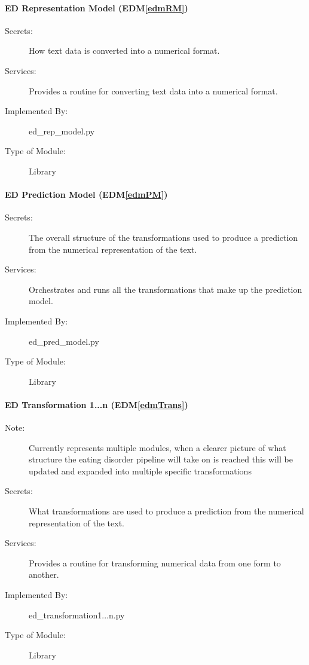 \documentclass[12pt, titlepage]{article}
\newcommand{\edmref}[1]{EDM\ref{#1}}
\begin{document}
\paragraph{ED Representation Model (\edmref{edmRM})}
\begin{description}
\item[Secrets:] How text data is converted into a numerical format.
\item[Services:] Provides a routine for converting text data into a numerical format.
\item[Implemented By:] ed\_rep\_model.py
\item[Type of Module:] Library
\end{description}

\paragraph{ED Prediction Model (\edmref{edmPM})}
\begin{description}
\item[Secrets:] The overall structure of the transformations used to produce a prediction from the numerical representation of the text.
\item[Services:] Orchestrates and runs all the transformations that make up the prediction model.
\item[Implemented By:] ed\_pred\_model.py
\item[Type of Module:] Library
\end{description}

\paragraph{ED Transformation 1...n (\edmref{edmTrans})}
\begin{description}
\item[Note:] Currently represents multiple modules, when a clearer picture of what structure the eating disorder pipeline will take on is reached this will be updated and expanded into multiple specific transformations
\item[Secrets:] What transformations are used to produce a prediction from the numerical representation of the text.
\item[Services:] Provides a routine for transforming numerical data from one form to another.
\item[Implemented By:] ed\_transformation1...n.py
\item[Type of Module:] Library
\end{description}
\end{document}
